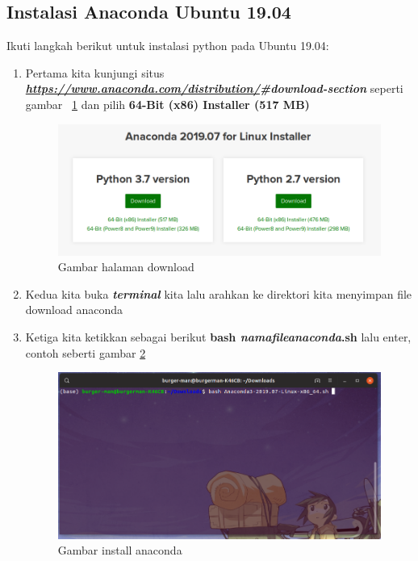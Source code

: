 \subsection{Instalasi Anaconda Ubuntu 19.04}
Ikuti langkah berikut untuk instalasi python pada Ubuntu 19.04:
\begin{enumerate}
\item Pertama kita kunjungi situs \\ \textbf{\textit{\url{https://www.anaconda.com/distribution/}\#download-section}} seperti gambar ~\ref{anacondadownload} dan pilih \textbf{64-Bit (x86) Installer (517 MB)}
\begin{figure}[H]
\centering
\includegraphics[width=1\textwidth]{figures/ubuntu/anacondadownload.png}
\caption{Gambar halaman download}
\label{anacondadownload}
\end{figure}

\item Kedua kita buka \textit{\textbf{terminal}} kita lalu arahkan ke direktori kita menyimpan file download anaconda

\item Ketiga kita ketikkan sebagai berikut \textbf{bash \textit{namafileanaconda}.sh} lalu enter, contoh seberti gambar \ref{anacondabash}
\begin{figure}[H]
\centering
\includegraphics[width=1\textwidth]{figures/ubuntu/anacondabash.png}
\caption{Gambar install anaconda}
\label{anacondabash}
\end{figure}


\end{enumerate}
